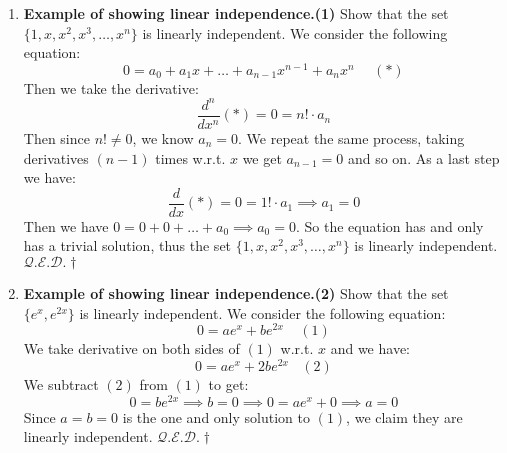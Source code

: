 \documentclass[oneside, 12pt]{book}
\newcommand{\settag}[1]{\renewcommand{\theenumi}{#1}}
\newcommand{\qed}{\hfill $\mathcal{Q}.\mathcal{E}.\mathcal{D}.\dagger$}
\newcommand{\tbf}[1]{\textbf{#1}}
\begin{document}
\begin{enumerate}
        \settag{1.4.*}
        \item \tbf{Example of showing linear independence.(1)} Show that the set $\{1,x,x^2,x^3,\ldots,x^n\}$ is linearly independent. We consider the following equation:
        \begin{equation*}
            0 = a_0 + a_1x + \ldots + a_{n-1}x^{n-1}+a_n x^n~~~~~~(*)
        \end{equation*}
        Then we take the derivative:
        \begin{equation*}
            \frac{d^n}{dx^n}(*)= 0 = n!\cdot a_n
        \end{equation*}
        Then since $n! \neq 0$, we know $a_n=0$. We repeat the same process, taking derivatives $(n-1)$ times w.r.t. $x$ we get $a_{n-1}=0$ and so on. As a last step we have:
        \begin{equation*}
            \frac{d}{dx}(*) = 0 = 1!\cdot a_1 \implies a_1 = 0
        \end{equation*}
        Then we have $0 = 0 + 0 +\ldots + a_0 \implies a_0 = 0$. So the equation has and only has a trivial solution, thus the set $\{1,x,x^2,x^3,\ldots,x^n\}$ is linearly independent. \qed
        
        \settag{1.4.*}
        \item \tbf{Example of showing linear independence.(2)} Show that the set $\{e^x, e^{2x}\}$ is linearly independent. We consider the following equation:
        \begin{equation*}
            0 = ae^x + be^{2x}~~~~~(1)
        \end{equation*}
        We take derivative on both sides of $(1)$ w.r.t. $x$ and we have:
        \begin{equation*}
            0 = ae^x + 2be^{2x}~~~~(2)
        \end{equation*}
        We subtract $(2)$ from $(1)$ to get:
        \begin{equation*}
            0 = be^{2x} \implies b = 0 \implies 0 = ae^x + 0 \implies a = 0
        \end{equation*}
        Since $a=b=0$ is the one and only solution to $(1)$, we claim they are linearly independent. \qed
    \end{enumerate}
    
\end{document}
